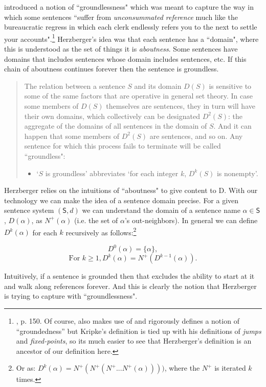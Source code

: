 \documentclass[12pt]{article}
\theoremstyle{remark}
\def\S{\textsf{S}}
\begin{document}
\cite{herzberger1970} introduced a notion of ``groundlessness" which was meant to capture the way in which some sentences ``suffer from \textit{unconsummated reference} much like the bureaucratic regress in which each clerk endlessly refers you to the next to settle your accounts".\footnote{\cite{herzberger1970}, p. 150. Of course, \cite{kripke75} also makes use of and rigorously defines a notion of ``groundedness'' but Kripke's definition is tied up with his definitions of \textit{jumps} and \textit{fixed-points}, so its much easier to see that Herzberger's definition is an ancestor of our definition here.} Herzberger's idea was that each sentence has a ``domain", where this is understood as the set of things it is \textit{aboutness}. Some sentences have domains that includes sentences whose domain includes sentences, etc. If this chain of aboutness continues forever then the sentence is groundless.

\begin{quote}
The relation between a sentence $S$ and its domain $D(S)$ is sensitive to some of the same factors that are operative in general set theory. In case some members of $D(S)$ themselves are sentences, they in turn will have their own domains, which collectively can be designated $D^2(S)$: the aggregate of the domains of all sentences in the domain of $S$. And it can happen that some members of $D^2(S)$ are sentences, and so on. Any sentence for which this process fails to terminate will be called ``groundless":
\begin{itemize}
\item `$S$ is groundless' abbreviates `for each integer $k$, $D^k(S)$ is nonempty'.   
\end{itemize}
\end{quote}

Herzberger relies on the intuitions of ``aboutness" to give content to D. With our technology we can make the idea of a sentence domain precise.  For a given sentence system $(\S,d)$ we can understand the domain of a sentence name $\alpha \in \S$, $D(\alpha)$, as $N^{+}(\alpha)$ (i.e. the set of $\alpha$'s out-neighbors). In general we can define $D^k(\alpha)$ for each $k$ recursively as follows:\footnote{Or as: $D^k(\alpha) = N^+(N^+(N^+...N^+(\alpha))))$, where the $N^+$ is iterated $k$ times.}

\[D^0(\alpha) = \{\alpha\},\]
\[\text{For } k \geq 1, D^k(\alpha) = N^+(D^{k-1}(\alpha)).\]

Intuitively, if a sentence is grounded then that excludes the ability to start at it and walk along references forever. And this is clearly the notion that Herzberger is trying to capture with ``groundlessness".
\end{document}
